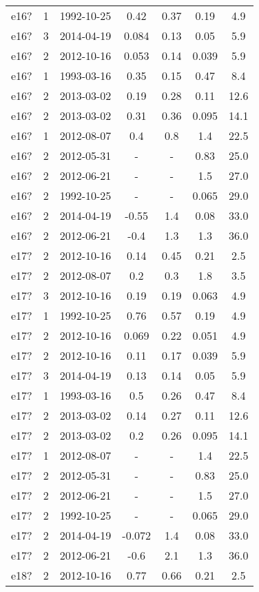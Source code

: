 \begin{table*}[htp]
\begin{tabular}{ccccccc}
e16? & 1 & 1992-10-25 & 0.42 & 0.37 & 0.19 & 4.9 \\
e16? & 3 & 2014-04-19 & 0.084 & 0.13 & 0.05 & 5.9 \\
e16? & 2 & 2012-10-16 & 0.053 & 0.14 & 0.039 & 5.9 \\
e16? & 1 & 1993-03-16 & 0.35 & 0.15 & 0.47 & 8.4 \\
e16? & 2 & 2013-03-02 & 0.19 & 0.28 & 0.11 & 12.6 \\
e16? & 2 & 2013-03-02 & 0.31 & 0.36 & 0.095 & 14.1 \\
e16? & 1 & 2012-08-07 & 0.4 & 0.8 & 1.4 & 22.5 \\
e16? & 2 & 2012-05-31 & - & - & 0.83 & 25.0 \\
e16? & 2 & 2012-06-21 & - & - & 1.5 & 27.0 \\
e16? & 2 & 1992-10-25 & - & - & 0.065 & 29.0 \\
e16? & 2 & 2014-04-19 & -0.55 & 1.4 & 0.08 & 33.0 \\
e16? & 2 & 2012-06-21 & -0.4 & 1.3 & 1.3 & 36.0 \\
e17? & 2 & 2012-10-16 & 0.14 & 0.45 & 0.21 & 2.5 \\
e17? & 2 & 2012-08-07 & 0.2 & 0.3 & 1.8 & 3.5 \\
e17? & 3 & 2012-10-16 & 0.19 & 0.19 & 0.063 & 4.9 \\
e17? & 1 & 1992-10-25 & 0.76 & 0.57 & 0.19 & 4.9 \\
e17? & 2 & 2012-10-16 & 0.069 & 0.22 & 0.051 & 4.9 \\
e17? & 2 & 2012-10-16 & 0.11 & 0.17 & 0.039 & 5.9 \\
e17? & 3 & 2014-04-19 & 0.13 & 0.14 & 0.05 & 5.9 \\
e17? & 1 & 1993-03-16 & 0.5 & 0.26 & 0.47 & 8.4 \\
e17? & 2 & 2013-03-02 & 0.14 & 0.27 & 0.11 & 12.6 \\
e17? & 2 & 2013-03-02 & 0.2 & 0.26 & 0.095 & 14.1 \\
e17? & 1 & 2012-08-07 & - & - & 1.4 & 22.5 \\
e17? & 2 & 2012-05-31 & - & - & 0.83 & 25.0 \\
e17? & 2 & 2012-06-21 & - & - & 1.5 & 27.0 \\
e17? & 2 & 1992-10-25 & - & - & 0.065 & 29.0 \\
e17? & 2 & 2014-04-19 & -0.072 & 1.4 & 0.08 & 33.0 \\
e17? & 2 & 2012-06-21 & -0.6 & 2.1 & 1.3 & 36.0 \\
e18? & 2 & 2012-10-16 & 0.77 & 0.66 & 0.21 & 2.5 \\

\end{tabular}
\end{table*}
